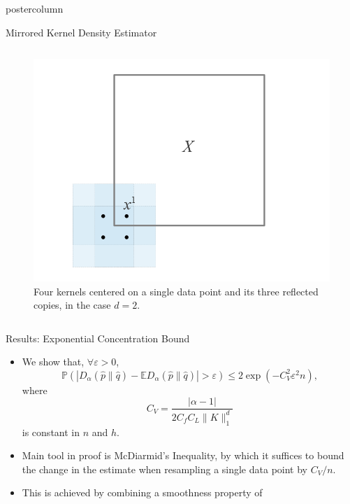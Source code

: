 \documentclass[final,hyperref={pdfpagelabels=false}]{beamer}
\newcommand{\e}{\varepsilon}
\newcommand{\E}{\mathbb{E}}
\renewcommand{\P}{\mathbb{P}}
\begin{document}
\begin{frame}
\begin{columns}
\begin{column}{.32\textwidth}
\begin{beamercolorbox}[center,wd=\textwidth]{postercolumn}
\begin{minipage}[T]{.95\textwidth}
{\begin{block}{Mirrored Kernel Density Estimator}
\begin{columns}
\begin{column}{.36\textwidth}
\begin{figure}[h!]
                    \includegraphics[width=\linewidth]{figures/mirror_fig}
                    \caption{\scriptsize Four kernels centered on a single data
                                         point and its three reflected copies,
                                         in the case $d = 2$.}
                    \label{fig:mirror_fig}
                  \end{figure}
                \end{column}
              \end{columns}
            \end{block}
            \vfill
            \begin{block}{\normalsize Results: Exponential Concentration Bound}
              \begin{itemize}
              \item We show that, $\forall \e > 0$,
                \[\P\left(
                        \left| D_\alpha(\hat p \| \hat q)
                           - \E D_\alpha(\hat p \| \hat q) \right|
                        > \e
                    \right)
                    \leq 2\exp\left( -C_V^2\e^2n \right),\]
              where
              \vspace{-5mm}
\[C_V = \frac{|\alpha - 1|}{2C_fC_L\|K\|_1^d}\]
              is constant in $n$ and $h$.
              \item Main tool in proof is McDiarmid's Inequality, by which it
              suffices to bound the change in the estimate when resampling a
              single data point by $C_V/n$.
              \item This is achieved by combining a smoothness property of

\end{itemize}
\end{block}}
\end{minipage}
\end{beamercolorbox}
\end{column}
\end{columns}
\end{frame}
\end{document}

